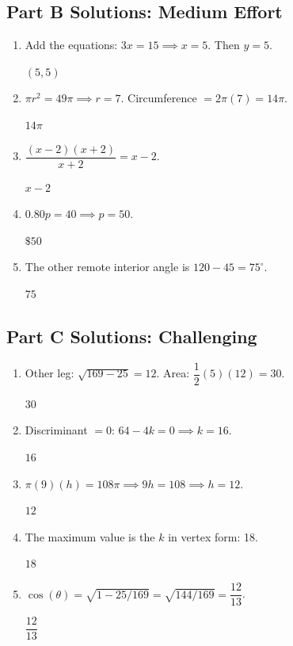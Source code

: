 \documentclass[14pt]{extarticle}
\begin{document}
\subsection*{Part B Solutions: Medium Effort}
\begin{enumerate}
  \item Add the equations: \(3x = 15 \implies x = 5\). Then \(y = 5\).

  \(\boxed{(5, 5)}\)

  \item \(\pi r^2 = 49\pi \implies r = 7\). Circumference \(= 2\pi(7) = 14\pi\).

  \(\boxed{14\pi}\)

  \item \(\dfrac{(x-2)(x+2)}{x+2} = x - 2\).

  \(\boxed{x - 2}\)

  \item \(0.80p = 40 \implies p = 50\).

  \(\boxed{\$50}\)

  \item The other remote interior angle is \(120 - 45 = 75^\circ\).

  \(\boxed{75}\)
\end{enumerate}

\subsection*{Part C Solutions: Challenging}
\begin{enumerate}
  \item Other leg: \(\sqrt{169 - 25} = 12\). Area: \(\dfrac{1}{2}(5)(12) = 30\).

  \(\boxed{30}\)

  \item Discriminant \(= 0\): \(64 - 4k = 0 \implies k = 16\).

  \(\boxed{16}\)

  \item \(\pi(9)(h) = 108\pi \implies 9h = 108 \implies h = 12\).

  \(\boxed{12}\)

  \item The maximum value is the \(k\) in vertex form: 18.

  \(\boxed{18}\)

  \item \(\cos(\theta) = \sqrt{1 - 25/169} = \sqrt{144/169} = \dfrac{12}{13}\).

  \(\boxed{\dfrac{12}{13}}\)
\end{enumerate}
\end{document}
